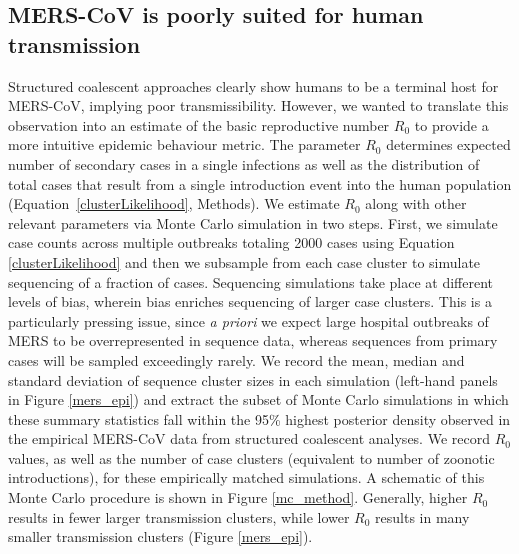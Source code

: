 \documentclass[11pt,oneside,letterpaper]{article}
\begin{document}
\subsection*{MERS-CoV is poorly suited for human transmission}

Structured coalescent approaches clearly show humans to be a terminal host for MERS-CoV, implying poor transmissibility.
However, we wanted to translate this observation into an estimate of the basic reproductive number $R_{0}$ to provide a more intuitive epidemic behaviour metric.
The parameter $R_{0}$ determines expected number of secondary cases in a single infections as well as the distribution of total cases that result from a single introduction event into the human population (Equation~\ref{clusterLikelihood}, Methods).
We estimate $R_{0}$ along with other relevant parameters via Monte Carlo simulation in two steps.
First, we simulate case counts across multiple outbreaks totaling 2000 cases using Equation \ref{clusterLikelihood} and then we subsample from each case cluster to simulate sequencing of a fraction of cases.
Sequencing simulations take place at different levels of bias, wherein bias enriches sequencing of larger case clusters.
This is a particularly pressing issue, since \textit{a priori} we expect large hospital outbreaks of MERS to be overrepresented in sequence data, whereas sequences from primary cases will be sampled exceedingly rarely.
We record the mean, median and standard deviation of sequence cluster sizes in each simulation (left-hand panels in Figure \ref{mers_epi}) and extract the subset of Monte Carlo simulations in which these summary statistics fall within the 95\% highest posterior density observed in the empirical MERS-CoV data from structured coalescent analyses.
We record $R_{0}$ values, as well as the number of case clusters (equivalent to number of zoonotic introductions), for these empirically matched simulations.
A schematic of this Monte Carlo procedure is shown in Figure \ref{mc_method}.
Generally, higher $R_0$ results in fewer larger transmission clusters, while lower $R_0$ results in many smaller transmission clusters (Figure \ref{mers_epi}).
\end{document}
